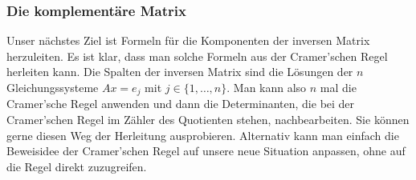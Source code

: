 \subsubsection{Die komplementäre Matrix}

Unser nächstes Ziel ist Formeln für die Komponenten der inversen Matrix herzuleiten. Es ist klar, dass man solche Formeln aus der Cramer'schen Regel herleiten kann. Die Spalten der inversen Matrix sind die Lösungen der $n$ Gleichungssysteme $A x = e_j$ mit $j \in \{1,\ldots,n\}$. Man kann also $n$ mal die Cramer'sche Regel anwenden und dann die Determinanten, die bei der Cramer'schen Regel im Zähler des Quotienten stehen, nachbearbeiten. Sie können gerne diesen Weg der Herleitung ausprobieren. Alternativ kann man einfach die Beweisidee der Cramer'schen Regel auf unsere neue Situation anpassen, ohne auf die Regel direkt zuzugreifen. 

